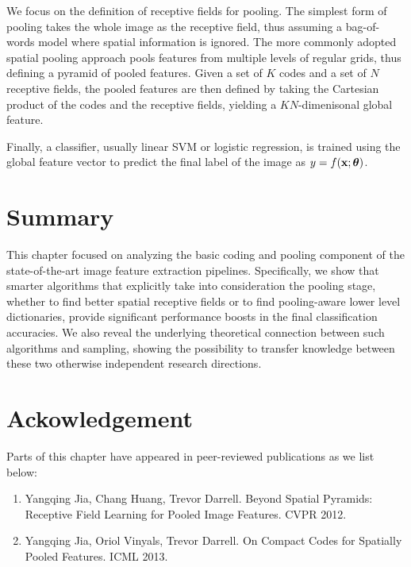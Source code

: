 We focus on the definition of receptive fields for pooling. The simplest form of pooling takes the whole image as the receptive field, thus assuming a bag-of-words model where spatial information is ignored. The more commonly adopted spatial pooling approach \cite{lazebnik2006beyond,Yang:2009vb} pools features from multiple levels of regular grids, thus defining a pyramid of pooled features. Given a set of $K$ codes and a set of $N$ receptive fields, the pooled features are then defined by taking the Cartesian product of the codes and the receptive fields, yielding a $KN$-dimenisonal global feature.

Finally, a classifier, usually linear SVM or logistic regression, is trained using the global feature vector to predict the final label of the image as $y = f(\mathbf{x};\boldsymbol{\theta})$.





\section{Summary}

This chapter focused on analyzing the basic coding and pooling component of the state-of-the-art image feature extraction pipelines. Specifically, we show that smarter algorithms that explicitly take into consideration the pooling stage, whether to find better spatial receptive fields or to find pooling-aware lower level dictionaries, provide significant performance boosts in the final classification accuracies. We also reveal the underlying theoretical connection between such algorithms and \nystrom sampling, showing the possibility to transfer knowledge between these two otherwise independent research directions.

\section*{Ackowledgement}
Parts of this chapter have appeared in peer-reviewed publications as we list below:
\begin{enumerate}
\item Yangqing Jia, Chang Huang, Trevor Darrell. Beyond Spatial Pyramids: Receptive Field Learning for Pooled Image Features. CVPR 2012.
\item Yangqing Jia, Oriol Vinyals, Trevor Darrell. On Compact Codes for Spatially Pooled Features. ICML 2013.
\end{enumerate}